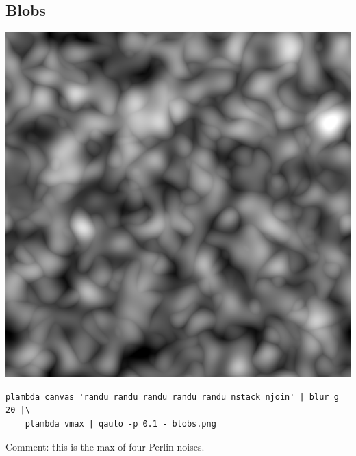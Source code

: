 \subsection{Blobs}
\includegraphics{blobs.png}
\begin{verbatim}
plambda canvas 'randu randu randu randu randu nstack njoin' | blur g 20 |\
	plambda vmax | qauto -p 0.1 - blobs.png
\end{verbatim}
Comment: this is the max of four Perlin noises.



